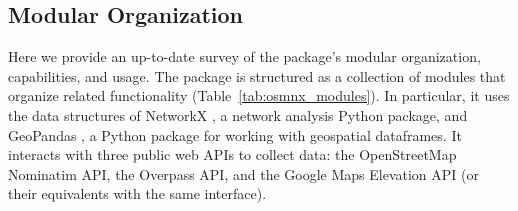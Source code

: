 \documentclass[12pt,letterpaper]{article} %
\begin{document}
\subsection{Modular Organization}\label{sec:modular_organization}

Here we provide an up-to-date survey of the package's modular organization, capabilities, and usage. The package is structured as a collection of modules that organize related functionality (Table~\ref{tab:osmnx_modules}). In particular, it uses the data structures of NetworkX \citep{hagberg_exploring_2008}, a network analysis Python package, and GeoPandas \citep{van_den_bossche_geopandasgeopandas_2024}, a Python package for working with geospatial dataframes. It interacts with three public web APIs to collect data: the OpenStreetMap Nominatim API, the Overpass API, and the Google Maps Elevation API (or their equivalents with the same interface).
\end{document}
